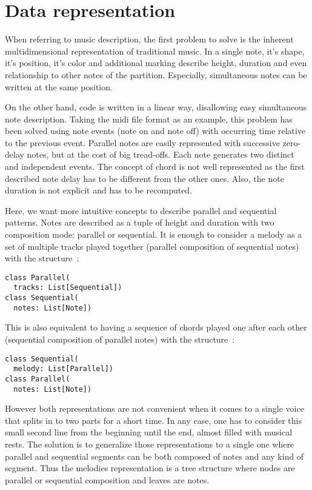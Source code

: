 \documentclass[twocolumn, 11pt]{article}
\begin{document}
\section{Data representation}

When referring to music description, the first problem to solve is the inherent multidimensional representation of traditional music. In a single note, it's shape, it's position, it's color and additional marking describe height, duration and even relationship to other notes of the partition.
Especially, simultaneous notes can be written at the same position.

On the other hand, code is written in a linear way, disallowing easy simultaneous note description.
Taking the midi file format as an example, this problem has been solved using note events (note on and note off) with occurring time relative to the previous event.
Parallel notes are easily represented with successive zero-delay notes, but at the cost of big tread-offs. Each note generates two distinct and independent events. The concept of chord is not well represented as the first described note delay has to be different from the other ones.
Also, the note duration is not explicit and has to be recomputed.

Here, we want more intuitive concepts to describe parallel and sequential patterns. Notes are described as a tuple of height and duration with two composition mode: parallel or sequential.
It is enough to consider a melody as a set of multiple tracks played together (parallel composition of sequential notes) with the structure~:
\begin{lstlisting}
class Parallel(
  tracks: List[Sequential])
class Sequential(
  notes: List[Note])
\end{lstlisting}

This is also equivalent to having a sequence of chords played one after each other (sequential composition of parallel notes) with the structure~:
\begin{lstlisting}
class Sequential(
  melody: List[Parallel])
class Parallel(
  notes: List[Note])
\end{lstlisting}

However both representations are not convenient when it comes to a single voice that splits in to two parts for a short time.
In any case, one has to consider this small second line from the beginning until the end, almost filled with musical rests.
The solution is to generalize those representations to a single one where parallel and sequential segments can be both composed of notes and any kind of segment.
Thus the melodies representation is a tree structure where nodes are parallel or sequential composition and leaves are notes.
\end{document}

